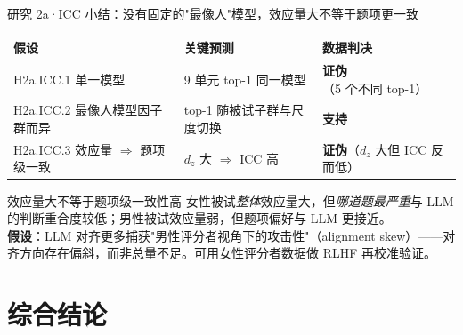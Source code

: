 \documentclass[aspectratio=169,professionalfonts]{beamer}
\begin{document}
\begin{frame}{研究 2a·ICC 小结：没有固定的"最像人"模型，效应量大不等于题项更一致}
  \small
  \setlength{\tabcolsep}{4pt}
  \begin{table}
    \centering
    \begin{tabular}{lll}
      \toprule
      假设 & 关键预测 & 数据判决 \\
      \midrule
      H2a.ICC.1 单一模型 & 9 单元 top-1 同一模型 & \textbf{证伪}（5 个不同 top-1） \\
      H2a.ICC.2 最像人模型因子群而异 & top-1 随被试子群与尺度切换 & \textbf{支持} \\
      H2a.ICC.3 效应量 $\Rightarrow$ 题项级一致 & $d_z$ 大 $\Rightarrow$ ICC 高 & \textbf{证伪}（$d_z$ 大但 ICC 反而低） \\
      \bottomrule
    \end{tabular}
  \end{table}

  \vspace{0.2em}
  \begin{alertblock}{效应量大不等于题项级一致性高}
    \small 女性被试\emph{整体}效应量大，但\emph{哪道题最严重}与 LLM 的判断重合度较低；男性被试效应量弱，但题项偏好与 LLM 更接近。\\
    \textbf{假设}：LLM 对齐更多捕获"男性评分者视角下的攻击性"（alignment skew）——对齐方向存在偏斜，而非总量不足。可用女性评分者数据做 RLHF 再校准验证。
  \end{alertblock}
\end{frame}

\section{综合结论}
\end{document}
